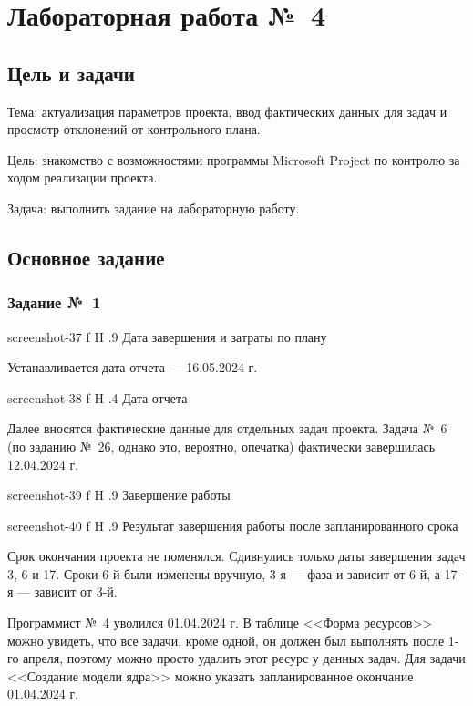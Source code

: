 \documentclass{bmstu}
\begin{document}
\chapter{Лабораторная работа №~4}

\section{Цель и задачи}

Тема: актуализация параметров проекта, ввод фактических данных для задач и просмотр отклонений от контрольного плана.

Цель: знакомство с возможностями программы Microsoft Project по контролю за ходом реализации проекта.

Задача: выполнить задание на лабораторную работу.

\section{Основное задание}

\subsection{Задание №~1}

    {screenshot-37}
    {f}
    {H}
    {.9\textwidth}
    {Дата завершения и затраты по плану}
    
Устанавливается дата отчета --- 16.05.2024 г.

    {screenshot-38}
    {f}
    {H}
    {.4\textwidth}
    {Дата отчета}
    
Далее вносятся фактические данные для отдельных задач проекта. 
Задача №~6 (по заданию №~26, однако это, вероятно, опечатка) фактически завершилась 12.04.2024 г.

    {screenshot-39}
    {f}
    {H}
    {.9\textwidth}
    {Завершение работы}
    
    {screenshot-40}
    {f}
    {H}
    {.9\textwidth}
    {Результат завершения работы после запланированного срока}
    
Срок окончания проекта не поменялся. 
Сдивнулись только даты завершения задач 3, 6 и 17. 
Сроки 6-й были изменены вручную, 3-я --- фаза и зависит от 6-й, а 17-я --- зависит от 3-й.

Программист №~4 уволился 01.04.2024 г. 
В таблице <<Форма ресурсов>> можно увидеть, что все задачи, кроме одной, он должен был выполнять после 1-го апреля, поэтому можно просто удалить этот ресурс у данных задач. 
Для задачи <<Создание модели ядра>> можно указать запланированное окончание 01.04.2024 г.
\end{document}
